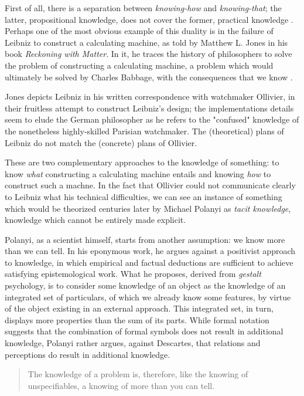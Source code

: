 First of all, there is a separation between \emph{knowing-how} and \emph{knowing-that}; the latter, propositional knowledge, does not cover the former, practical knowledge \citep{ryle_concept_1951}. Perhaps one of the most obvious example of this duality is in the failure of Leibniz to construct a calculating machine, as told by Matthew L. Jones in his book \emph{Reckoning with Matter}. In it, he traces the history of philosophers to solve the problem of constructing a calculating machine, a problem which would ultimately be solved by Charles Babbage, with the consequences that we know \citep{jones_reckoning_2016}.

Jones depicts Leibniz in his written correspondence with watchmaker Ollivier, in their fruitless attempt to construct Leibniz's design; the implementations details seem to elude the German philosopher as he refers to the "confused" knowledge of the nonetheless highly-skilled Parisian watchmaker. The (theoretical) plans of Leibniz do not match the (concrete) plans of Ollivier.

These are two complementary approaches to the knowledge of something: to know \emph{what} constructing a calculating machine entails and knowing \emph{how} to construct such a machne. In the fact that Ollivier could not communicate clearly to Leibniz what his technical difficulties, we can see an instance of something which would be theorized centuries later by Michael Polanyi as \emph{tacit knowledge}, knowledge which cannot be entirely made explicit.

Polanyi, as a scientist himself, starts from another assumption: we know more than we can tell. In his eponymous work, he argues against a positivist approach to knowledge, in which empirical and factual deductions are sufficient to achieve satisfying epistemological work. What he proposes, derived from \emph{gestalt} psychology, is to consider some knowledge of an object as the knowledge of an integrated set of particulars, of which we already know some features, by virtue of the object existing in an external approach. This integrated set, in turn, displays more properties than the sum of its parts. While formal notation suggests that the combination of formal symbols does not result in additional knowledge, Polanyi rather argues, against Descartes, that relations and perceptions do result in additional knowledge.

\begin{quote}
    The knowledge of a problem is, therefore, like the knowing of unspecifiables, a knowing of more than you can tell. \citep{polanyi_knowing_1969}
\end{quote}


